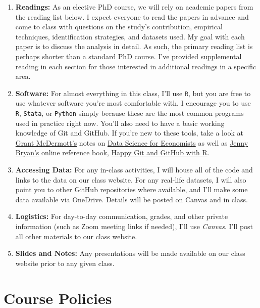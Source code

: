 \documentclass[11pt,]{article}
\begin{document}
\begin{enumerate}
\def\labelenumi{\arabic{enumi}.}
\item
  \textbf{Readings:} As an elective PhD course, we will rely on academic
  papers from the reading list below. I expect everyone to read the
  papers in advance and come to class with questions on the study's
  contribution, empirical techniques, identification strategies, and
  datasets used. My goal with each paper is to discuss the analysis in
  detail. As such, the primary reading list is perhaps shorter than a
  standard PhD course. I've provided supplemental reading in each
  section for those interested in additional readings in a specific
  area.
\item
  \textbf{Software:} For almost everything in this class, I'll use
  \texttt{R}, but you are free to use whatever software you're most
  comfortable with. I encourage you to use \texttt{R}, \texttt{Stata},
  or \texttt{Python} simply because these are the most common programs
  used in practice right now. You'll also need to have a basic working
  knowledge of Git and GitHub. If you're new to these tools, take a look
  at \href{https://grantmcdermott.com/}{Grant McDermott's} notes on
  \href{https://github.com/uo-ec607/lectures}{Data Science for
  Economists} as well as \href{https://jennybryan.org/}{Jenny Bryan's}
  online reference book, \href{https://happygitwithr.com/}{Happy Git and
  GitHub with R}.
\item
  \textbf{Accessing Data:} For any in-class activities, I will house all
  of the code and links to the data on our class website. For any
  real-life datasets, I will also point you to other GitHub repositories
  where available, and I'll make some data available via OneDrive.
  Details will be posted on Canvas and in class.
\item
  \textbf{Logistics:} For day-to-day communication, grades, and other
  private information (such as Zoom meeting links if needed), I'll use
  \emph{Canvas}. I'll post all other materials to our class website.
\item
  \textbf{Slides and Notes:} Any presentations will be made available on
  our class website prior to any given class.
\end{enumerate}

\hypertarget{course-policies}{%
\section{Course Policies}\label{course-policies}}
\end{document}
